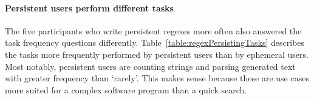 \paragraph{Persistent users perform different tasks} The five participants who write persistent regexes more often also answered the task frequency questions differently.  Table~\ref{table:regexPersistingTasks} describes the tasks more frequently performed by persistent users than by ephemeral users.  Most notably, persistent users are counting strings and parsing generated text with greater frequency than `rarely'.  This makes sense because these are use cases more suited for a complex software program than a quick search.









